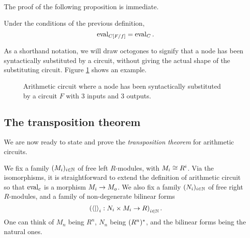 The proof of the following proposition is immediate.

\begin{proposition}
  Under the conditions of the previous definition,
  \[\operatorname{eval}_{C[F/f]} = \operatorname{eval}_C \text{.}\]
\end{proposition}

As a shorthand notation, we will draw octogones to signify that a node
has been syntactically substituted by a circuit, without giving the
actual shape of the substituting circuit. Figure
\ref{fig:substitution} shows an example.

\begin{figure}[!ht]
  \label{fig:substitution}
  \centering
  \caption{Arithmetic circuit where a node has been syntactically
    substituted by a circuit $F$ with $3$ inputs and $3$ outputs.}
\end{figure}



\subsection{The transposition theorem}
\label{sec:tellegen}
We are now ready to state and prove the
\emph{transposition theorem} for
arithmetic circuits. 

We fix a family $(M_i)_{i\in\mathbb{N}}$ of free left $R$-modules, with
$M_i\cong R^i$. Via the isomorphisms, it is straightforward to extend
the definition of arithmetic circuit so that $\operatorname{eval}_c$ is a morphism
$M_i\rightarrow M_o$.  We also fix a family $(N_i)_{i\in\mathbb{N}}$ of free right
$R$-modules, and a family of non-degenerate bilinear forms
\begin{equation}
  \label{eq:240}
  \left(\left\langle  \middle|  \right\rangle_i:N_i\times M_i\rightarrow R\right)_{i\in\mathbb{N}}
  \text{.}
\end{equation}
One can think of $M_n$ being $R^n$, $N_n$ being $(R^n)^\ast$, and
the bilinear forms being the natural ones.

